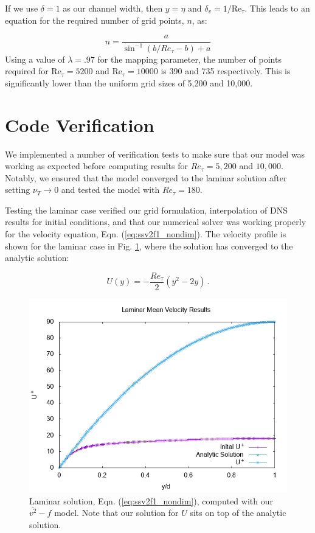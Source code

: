 \documentclass[a4paper,11pt]{article}
\begin{document}
If we use $\delta = 1$ as our channel width, then $y = \eta$ and $\delta_v = 1/\mathrm{Re}_{\tau}$.  This leads to an equation for the required number of grid points, $n$, as:

\begin{equation}
 n = \frac{a}{\sin^{-1}(b/Re_{\tau}-b)+a}
\end{equation}
Using a value of $\lambda = .97$ for the mapping parameter, the number of points required for $\mathrm{Re}_{\tau}=5200$ and $\mathrm{Re}_{\tau}=10000$ is 390 and 735 respectively. This is significantly lower than the uniform grid sizes of 5,200 and 10,000.


\section{Code Verification}

We implemented a number of verification tests to make sure that our model was
working as expected before computing results for $Re_\tau = 5,200$ and
$10,000$. Notably, we ensured that the model converged to the laminar solution
after setting $\nu_T \rightarrow 0$ and tested the model with $Re_\tau = 180$. 


Testing the laminar case verified our grid formulation, interpolation of DNS
results for initial conditions, and that our numerical solver was working
properly for the velocity equation, Eqn.
(\ref{eq:ssv2f1_nondim}). The velocity profile is shown for the laminar case in Fig.
\ref{fig:laminar}, where the solution has converged to the analytic
solution: 

\begin{equation*}
  U(y) = -\frac{Re_\tau}{2}\left(y^2 - 2y\right) \, .
\end{equation*}

\begin{figure}
 \centering
 \includegraphics[width=.7\textwidth]{laminar}
 \caption{Laminar solution, Eqn. (\ref{eq:ssv2f1_nondim}), computed with
our $\overline{v^2}-f$ model. Note that our solution for $U$ sits on top of the
analytic solution.}
 \label{fig:laminar}
\end{figure}
\end{document}
